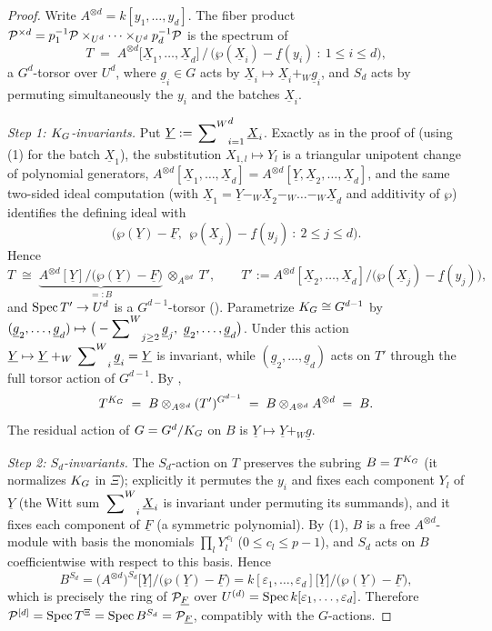 \documentclass[11pt]{article}
\providecommand{\eps}{\varepsilon}                  %
\newcommand{\wv}[1]{\underline{#1}}                 %
\newcommand{\Wsum}{\sideset{}{^{W}}\sum}            %
\begin{document}
\begin{proof}
Write $A^{\otimes d}=k[y_1,\dots,y_d]$.  The fiber product
$\mathcal{P}^{\times d}=p_1^{-1}\mathcal{P}\times_{U^d}\dots\times_{U^d}p_d^{-1}\mathcal{P}$ is the
spectrum of
\[
T\;=\;A^{\otimes d}\big[\wv X_1,\dots,\wv X_d\big]\,/\,
\big(\wp(\wv X_i)-\wv f(y_i)\ :\ 1\le i\le d\big),
\]
a $G^d$-torsor over $U^d$, where $\wv g_i\in G$ acts by
$\wv X_i\mapsto\wv X_i+_W\wv g_i$, and $S_d$ acts by permuting
simultaneously the $y_i$ and the batches $\wv X_i$.

\emph{Step 1: $K_{G}$-invariants.}
Put $\wv Y:=\Wsum_{i=1}^{d}\wv X_i$.  Exactly as in the proof of
 (using (1) for the batch
$\wv X_1$), the substitution
$X_{1,l}\mapsto Y_l$ is a triangular unipotent change of polynomial
generators, $A^{\otimes d}[\wv X_1,\dots,\wv X_d]
=A^{\otimes d}[\wv Y,\wv X_2,\dots,\wv X_d]$, and the same two-sided
ideal computation (with $\wv X_1=\wv Y-_W\wv X_2-_W\dots-_W\wv X_d$ and
additivity of $\wp$) identifies the defining ideal with
\[
\big(\wp(\wv Y)-\wv F,\ \ \wp(\wv X_j)-\wv f(y_j)\ :\ 2\le j\le d\big).
\]
Hence
\[
T\;\cong\;
\underbrace{A^{\otimes d}[\wv Y]/\big(\wp(\wv Y)-\wv F\big)}_{=:B}
\ \otimes_{A^{\otimes d}}\ T',
\qquad
T':=A^{\otimes d}[\wv X_2,\dots,\wv X_d]/\big(\wp(\wv X_j)-\wv f(y_j)\big),
\]
and $\operatorname{Spec} T'\to U^d$ is a $G^{d-1}$-torsor ().
Parametrize $K_{G}\cong G^{d-1}$ by
$(\wv g_2,\dots,\wv g_d)\mapsto
\big(-\!\Wsum_{j\ge2}\wv g_j,\ \wv g_2,\dots,\wv g_d\big)$.
Under this action $\wv Y\mapsto\wv Y+_W\Wsum_i\wv g_i=\wv Y$ is invariant,
while $(\wv g_2,\dots,\wv g_d)$ acts on $T'$ through the full torsor
action of $G^{d-1}$.  By ,
\[
T^{K_{G}}\;=\;B\otimes_{A^{\otimes d}}(T')^{G^{d-1}}
\;=\;B\otimes_{A^{\otimes d}}A^{\otimes d}\;=\;B .
\]
The residual action of $G=G^d/K_{G}$ on $B$ is $\wv Y\mapsto\wv Y+_W\wv g$.

\emph{Step 2: $S_d$-invariants.}
The $S_d$-action on $T$ preserves the subring $B=T^{K_{G}}$ (it normalizes
$K_{G}$ in $\Xi$); explicitly it permutes the $y_i$ and fixes each component
$Y_l$ of $\wv Y$ (the Witt sum $\Wsum_i\wv X_i$ is invariant under
permuting its summands), and it fixes each component of $\wv F$ (a
symmetric polynomial).  By (1), $B$ is a free
$A^{\otimes d}$-module with basis the monomials
$\prod_lY_l^{\,c_l}$ ($0\le c_l\le p-1$), and $S_d$ acts on $B$
coefficientwise with respect to this basis.  Hence
\[
B^{S_d}
=\big(A^{\otimes d}\big)^{S_d}\big[\wv Y\big]/\big(\wp(\wv Y)-\wv F\big)
=k[\eps_1,\dots,\eps_d]\big[\wv Y\big]/\big(\wp(\wv Y)-\wv F\big),
\]
which is precisely the ring of $\cP_{\wv F}$ over
$U^{(d)}=\Spec k[\eps_1,\dots,\eps_d]$.  Therefore
$\cP^{[d]}=\Spec T^{\Xi}=\Spec B^{S_d}=\cP_{\wv F}$, compatibly with the
$G$-actions.
\end{proof}
\end{document}

